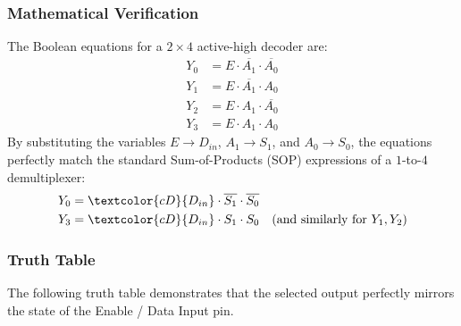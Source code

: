 \documentclass[12pt,a3paper]{article}
\begin{document}
\begin{enumerate}
\begin{tcolorbox}[enhanced,breakable,ansbox,colback=cD!4,colframe=cD,boxrule=0.8pt,arc=5pt,title={\textbf{Answer}},fonttitle=\bfseries\color{white},colbacktitle=cD]
\subsubsection*{Mathematical Verification}
The Boolean equations for a $2 \times 4$ active-high decoder are:
\begin{align*}
    Y_0 &= E \cdot \overline{A_1} \cdot \overline{A_0} \\
    Y_1 &= E \cdot \overline{A_1} \cdot A_0 \\
    Y_2 &= E \cdot A_1 \cdot \overline{A_0} \\
    Y_3 &= E \cdot A_1 \cdot A_0
\end{align*}
By substituting the variables $E \rightarrow D_{in}$, $A_1 \rightarrow S_1$, and $A_0 \rightarrow S_0$, the equations perfectly match the standard Sum-of-Products (SOP) expressions of a $1$-to-$4$ demultiplexer:
\begin{align*}
    Y_0 &= \textcolor{cD}{D_{in}} \cdot \overline{S_1} \cdot \overline{S_0} \\
    Y_3 &= \textcolor{cD}{D_{in}} \cdot S_1 \cdot S_0 \quad \text{(and similarly for } Y_1, Y_2)
\end{align*}

\subsubsection*{Truth Table}
The following truth table demonstrates that the selected output perfectly mirrors the state of the Enable / Data Input pin.


\end{tcolorbox}
\end{enumerate}
\end{document}

